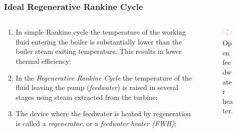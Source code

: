 \documentclass[10pt,compress]{beamer}
\begin{document}
\begin{frame}
 \frametitle{Ideal Regenerative Rankine Cycle}
  \begin{columns}
   \begin{column}[c]{0.5\linewidth}
    \begin{enumerate} %
     \item <1-> In simple Rankine cycle the temperature of the working fluid entering the boiler is substantially lower than the boiler steam exiting temperature.  This results in lower thermal efficiency;
     \item <2-> In the {\it Regenerative Rankine Cycle} the temperature of the fluid leaving the pump ({\it feedwater}) is raised in several stages using steam extracted from the turbine;
     \item <3-> The device where the feedwater is heated by regeneration is called a {\it regenerator}, or a {\it feedwater heater (FWH)};
    \end{enumerate} 
   \end{column}

   \begin{column}[c]{0.5\linewidth} 
    \begin{figure}%
     \begin{center}
      \includegraphics[width=6.25cm,clip]{./Pics/Regenerative_Rankine_Cycle_OpenFWH}
      \caption{\scriptsize Open feedwater heater.} 
     \end{center}
    \end{figure}  
   \end{column}
  \end{columns}
 \normalsize
\end{frame}
\end{document}
